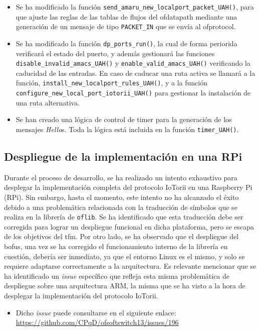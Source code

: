 \begin{itemize}
    \item Se ha modificado la función \texttt{send\_amaru\_new\_localport\_packet\_UAH()}, para que ajuste las reglas de las tablas de flujos del ofdatapath mediante una generación de un mensaje de tipo \texttt{PACKET\_IN} que se envía al ofprotocol.
    \item Se ha modificado la función \texttt{dp\_ports\_run()}, la cual de forma periorida verificará el estado del puerto, y además gestionará las funciones \texttt{disable\_invalid\_amacs\_UAH()} y \texttt{enable\_valid\_amacs\_UAH()} verificando la caducidad de las entradas. En caso de caducar una ruta activa se llamará a la función, \texttt{install\_new\_localport\_rules\_UAH()}, y a la función \texttt{configure\_new\_local\_port\_iotorii\_UAH()} para gestionar la instalación de una ruta alternativa.
    \item Se han creado una lógica de control de timer para la generación de los mensajes \textit{Hello}s. Toda la lógica está incluida en la función \texttt{timer\_UAH()}.
\end{itemize}

\subsection{Despliegue de la implementación en una RPi}

Durante el proceso de desarrollo, se ha realizado un intento exhaustivo para desplegar la implementación completa del protocolo IoTorii en una Raspberry Pi (RPi). Sin embargo, hasta el momento, este intento no ha alcanzado el éxito debido a una problemática relacionada con la traducción de símbolos que se realiza en la librería de \texttt{oflib}. Se ha identificado que esta traducción debe ser corregida para lograr un despliegue funcional en dicha plataforma, pero se escapa de los objetivos del \gls{tfm}. Por otro lado, se ha observado que el despliegue del \gls{bofus}, una vez se ha corregido el funcionamiento interno de la librería en cuestión, debería ser inmediato, ya que el entorno Linux es el mismo, y solo se requiere adaptarse correctamente a la arquitectura. Es relevante mencionar que se ha identificado un \textit{issue} específico que refleja esta misma problemática de despliegue sobre una arquitectura ARM, la misma que se ha visto a la hora de desplegar la implementación del protocolo IoTorii.

\begin{itemize}
    \item Dicho \textit{issue}  puede consultarse en el siguiente enlace: \url{https://github.com/CPqD/ofsoftswitch13/issues/196}
\end{itemize}

